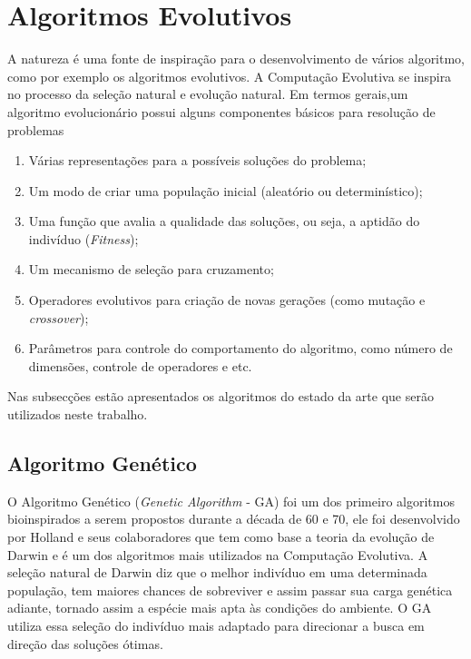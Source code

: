\section{Algoritmos Evolutivos}
\label{sec:evolutionary_algorithms}
A natureza é uma fonte de inspiração para o desenvolvimento de vários algoritmo, como por exemplo os algoritmos evolutivos. A Computação Evolutiva se inspira no processo da seleção natural e evolução natural. 
Em termos gerais,um algoritmo evolucionário possui alguns componentes básicos para resolução de problemas \cite{parpinelli2011new}

\begin{enumerate}
\item Várias representações para a possíveis soluções do problema;
\item Um modo de criar uma população inicial (aleatório ou determinístico);
\item Uma função que avalia a qualidade das soluções, ou seja, a aptidão do indivíduo (\textit{Fitness});
\item Um mecanismo de seleção para cruzamento;
\item Operadores evolutivos para criação de novas gerações (como mutação e \textit{crossover});
\item Parâmetros para controle do comportamento do algoritmo, como número de dimensões, controle de operadores e etc.  
\end{enumerate}

Nas subsecções estão apresentados os algoritmos do estado da arte que serão utilizados neste trabalho.

\subsection{Algoritmo Genético}
\label{sec:genetic_algorithms}
O Algoritmo Genético (\textit{Genetic Algorithm} - GA) foi um dos primeiro algoritmos bioinspirados a serem propostos durante a década de 60 e 70, ele foi desenvolvido por Holland e seus colaboradores que tem como base a teoria da evolução de Darwin \cite{ga} e é um dos algoritmos mais utilizados na Computação Evolutiva. A seleção natural de Darwin diz que o melhor indivíduo em uma determinada população, tem maiores chances de sobreviver e assim passar sua carga genética adiante, tornado assim a espécie mais apta às condições do ambiente. O GA utiliza essa seleção do indivíduo mais adaptado para direcionar a busca em direção das soluções ótimas.

